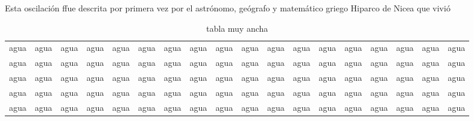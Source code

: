 \documentclass{report}
\theoremstyle{remark}%
\begin{document}
\begin{landscape}
Esta oscilación ffue descrita por primera vez por el astrónomo, geógrafo y matemático griego Hiparco de Nicea que vivió 

\begin{table}
\centering
\begin{tabular}{*{18}{c}}%
	agua & agua & agua & agua & agua & agua & agua & agua & agua & agua & agua & agua & agua & agua & agua & agua & agua & agua  \\
	agua & agua & agua & agua & agua & agua & agua & agua & agua & agua & agua & agua & agua & agua & agua & agua & agua & agua  \\
	agua & agua & agua & agua & agua & agua & agua & agua & agua & agua & agua & agua & agua & agua & agua & agua & agua & agua  \\
	agua & agua & agua & agua & agua & agua & agua & agua & agua & agua & agua & agua & agua & agua & agua & agua & agua & agua  \\
	agua & agua & agua & agua & agua & agua & agua & agua & agua & agua & agua & agua & agua & agua & agua & agua & agua & agua  \\
\end{tabular}
\caption{tabla muy ancha}
\end{table}

\end{landscape}
\setlength{\columnsep}{1cm}%
\setlength{\columnseprule}{1mm}
\end{document}
